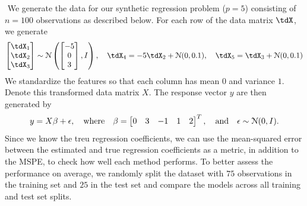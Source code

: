 $ $\newline
We generate the data for our synthetic regression problem ($p=5$) consisting of $n=100$ observations as described below. For each row of the data matrix $\tdX$, we generate
\[
\begin{bmatrix} \tdX_1 \\ \tdX_2 \\ \tdX_3 \end{bmatrix} \sim \distNorm \left( \begin{bmatrix} -5 \\ 0 \\ 3 \end{bmatrix}, I \right), \quad \tdX_4 = -5\tdX_2 + \distNorm(0, 0.1), \quad \tdX_5 = \tdX_3 + \distNorm(0, 0.1)
\]
We standardize the features so that each column has mean $0$ and variance $1$. Denote this transformed data matrix $X$. The response vector $y$ are then generated by
\[
y = X\beta + \epsilon, \quad \text{where} \quad \beta=\begin{bmatrix} 0 & 3 & -1 & 1 & 2 \end{bmatrix}^T, \quad \text{and} \quad \epsilon \sim \mathcal{N}(0, I).
\]
Since we know the treu regression coefficients, we can use the mean-squared error between the estimated and true regression coefficients as a metric, in addition to the MSPE, to check how well each method performs. To better assess the performance on average, we randomly split the dataset with $75$ observations in the training set and $25$ in the test set and compare the models across all training and test set splits.

